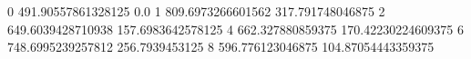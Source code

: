 0 491.90557861328125 0.0
1 809.6973266601562 317.791748046875
2 649.6039428710938 157.6983642578125
4 662.327880859375 170.42230224609375
6 748.6995239257812 256.7939453125
8 596.776123046875 104.87054443359375
